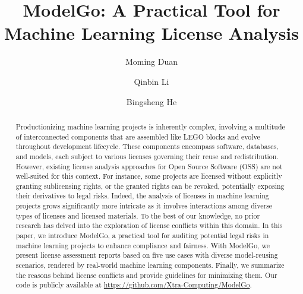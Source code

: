 \documentclass[sigconf]{acmart}
\begin{document}
\title{ModelGo: A Practical Tool for Machine Learning License Analysis}


\author{Moming Duan}


\author{Qinbin Li}

\author{Bingsheng He}

\renewcommand{\shortauthors}{Moming Duan, Qinbin Li, \& Bingsheng He}

\begin{abstract}
Productionizing machine learning projects is inherently complex, involving a multitude of interconnected components that are assembled like LEGO blocks and evolve throughout development lifecycle.
These components encompass software, databases, and models, each subject to various licenses governing their reuse and redistribution.
However, existing license analysis approaches for Open Source Software (OSS) are not well-suited for this context.
For instance, some projects are licensed without explicitly granting sublicensing rights, or the granted rights can be revoked, potentially exposing their derivatives to legal risks.
Indeed, the analysis of licenses in machine learning projects grows significantly more intricate as it involves interactions among diverse types of licenses and licensed materials.
To the best of our knowledge, no prior research has delved into the exploration of license conflicts within this domain.
In this paper, we introduce ModelGo, a practical tool for auditing potential legal risks in machine learning projects to enhance compliance and fairness.
With ModelGo, we present license assessment reports based on five use cases with diverse model-reusing scenarios, rendered by real-world machine learning components.
Finally, we summarize the reasons behind license conflicts and provide guidelines for minimizing them.
Our code is publicly available at \url{https://github.com/Xtra-Computing/ModelGo}.
\end{abstract}
\end{document}
